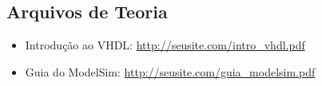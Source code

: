 \documentclass{article}
\begin{document}
\subsection*{Arquivos de Teoria}
\begin{itemize}
    \item Introdução ao VHDL: \href{http://seusite.com/intro_vhdl.pdf}{http://seusite.com/intro\_vhdl.pdf}
    \item Guia do ModelSim: \href{http://seusite.com/guia_modelsim.pdf}{http://seusite.com/guia\_modelsim.pdf}
\end{itemize}
\end{document}

